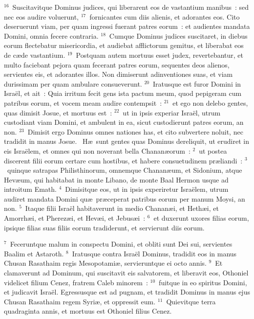 ${}^{16}$~Suscitavitque Dominus judices, qui liberarent eos de vastantium manibus~: sed nec eos audire voluerunt,
${}^{17}$~fornicantes cum diis alienis, et adorantes eos. Cito deseruerunt viam, per quam ingressi fuerant patres eorum~: et audientes mandata Domini, omnia fecere contraria.
${}^{18}$~Cumque Dominus judices suscitaret, in diebus eorum flectebatur misericordia, et audiebat afflictorum gemitus, et liberabat eos de c\ae de vastantium.
${}^{19}$~Postquam autem mortuus esset judex, revertebantur, et multo faciebant pejora quam fecerant patres eorum, sequentes deos alienos, servientes eis, et adorantes illos. Non dimiserunt adinventiones suas, et viam durissimam per quam ambulare consueverunt.
${}^{20}$~Iratusque est furor Domini in Isra\"el, et ait~: Quia irritum fecit gens ista pactum meum, quod pepigeram cum patribus eorum, et vocem meam audire contempsit~:
${}^{21}$~et ego non delebo gentes, quas dimisit Josue, et mortuus est~:
${}^{22}$~ut in ipsis experiar Isra\"el, utrum custodiant viam Domini, et ambulent in ea, sicut custodierunt patres eorum, an non.
${}^{23}$~Dimisit ergo Dominus omnes nationes has, et cito subvertere noluit, nec tradidit in manus Josue.
~H\ae\ sunt gentes quas Dominus dereliquit, ut erudiret in eis Isra\"elem, et omnes qui non noverant bella Chanan\ae orum~:
${}^{2}$~ut postea discerent filii eorum certare cum hostibus, et habere consuetudinem pr\ae liandi~:
${}^{3}$~quinque satrapas Philisthinorum, omnemque Chanan\ae um, et Sidonium, atque Hev\ae um, qui habitabat in monte Libano, de monte Baal Hermon usque ad introitum Emath.
${}^{4}$~Dimisitque eos, ut in ipsis experiretur Isra\"elem, utrum audiret mandata Domini qu\ae\ pr\ae ceperat patribus eorum per manum Moysi, an non.
${}^{5}$~Itaque filii Isra\"el habitaverunt in medio Chanan\ae i, et Heth\ae i, et Amorrh\ae i, et Pherez\ae i, et Hev\ae i, et Jebus\ae i~:
${}^{6}$~et duxerunt uxores filias eorum, ipsique filias suas filiis eorum tradiderunt, et servierunt diis eorum.


${}^{7}$~Feceruntque malum in conspectu Domini, et obliti sunt Dei sui, servientes Baalim et Astaroth.
${}^{8}$~Iratusque contra Isra\"el Dominus, tradidit eos in manus Chusan Rasathaim regis Mesopotami\ae , servieruntque ei octo annis.
${}^{9}$~Et clamaverunt ad Dominum, qui suscitavit eis salvatorem, et liberavit eos, Othoniel videlicet filium Cenez, fratrem Caleb minorem~:
${}^{10}$~fuitque in eo spiritus Domini, et judicavit Isra\"el. Egressusque est ad pugnam, et tradidit Dominus in manus ejus Chusan Rasathaim regem Syri\ae , et oppressit eum.
${}^{11}$~Quievitque terra quadraginta annis, et mortuus est Othoniel filius Cenez.


